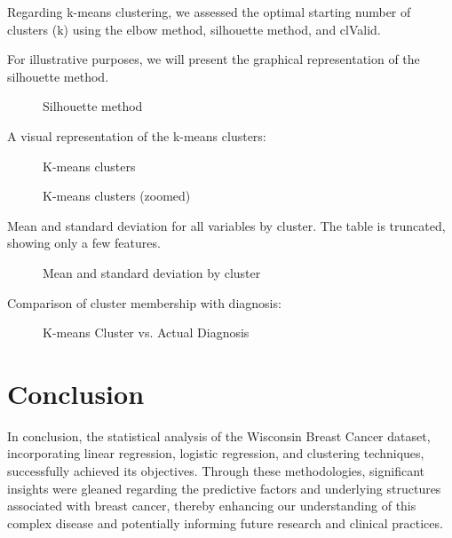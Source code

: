 \documentclass[conference]{IEEEtran}
\begin{document}
\vspace{0.5cm}

Regarding k-means clustering, we assessed the optimal
starting number of clusters (k) using the elbow method,
silhouette method, and clValid.

For illustrative purposes, we will present the graphical representation of the silhouette method.

\begin{figure}[H]
      \centering
       {}
      \caption{Silhouette method}
\end{figure}


A visual representation of the k-means clusters:

\begin{figure}[H]
      \centering
       {}
      \caption{K-means clusters}
\end{figure}

\begin{figure}[H]
      \centering
       {}
      \caption{K-means clusters (zoomed)}
\end{figure}

Mean and standard deviation for all variables by cluster.
The table is truncated, showing only a few features.

\begin{figure}[H]
      \centering
       {}
      \caption{Mean and standard deviation by cluster}
\end{figure}

Comparison of cluster membership with diagnosis:
\begin{figure}[H]
      \centering
       {}
      \caption{K-means Cluster vs. Actual Diagnosis}
\end{figure}


\vspace{0.2cm}
\section{{Conclusion}}

In conclusion, the statistical analysis of the Wisconsin Breast Cancer dataset, incorporating linear regression, logistic regression, and clustering techniques, successfully achieved its objectives. Through these methodologies, significant insights were gleaned regarding the predictive factors and underlying structures associated with breast cancer, thereby enhancing our understanding of this complex disease and potentially informing future research and clinical practices.



\end{document}
